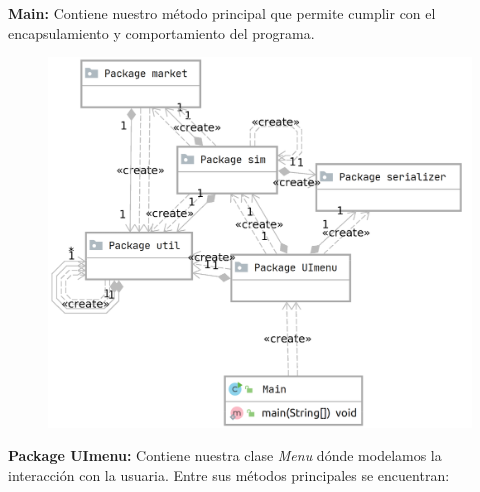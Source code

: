 \documentclass[letterpaper,11pt]{article}
\begin{document}
\textbf{Main: }Contiene nuestro método principal que permite cumplir con el encapsulamiento y comportamiento del programa.
\begin{figure}[htb]
	\centering
	\includegraphics[scale=.29]{main_diagram.png}
\end{figure}

\textbf{Package UImenu: } Contiene nuestra clase \textit{Menu} dónde modelamos la interacción con la usuaria. Entre sus métodos principales se encuentran:
\end{document}

